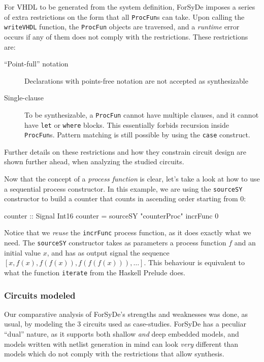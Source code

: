             For VHDL to be generated from the system definition, ForSyDe imposes a series of extra
            restrictions on the form that all \texttt{ProcFun}s can take. Upon calling the
            \texttt{writeVHDL} function, the \texttt{ProcFun} objects are traversed, and a
            \emph{runtime} error occurs if any of them does not comply with the restrictions.  These
            restrictions are:

            \begin{description}
                \item[``Point-full'' notation] Declarations with points-free notation are not
                    accepted as synthesizable

                \item[Single-clause] To be synthesizable, a \texttt{ProcFun} cannot have multiple
                    clauses, and it cannot have \texttt{let} or \texttt{where} blocks.  This
                    essentially forbids recursion inside \texttt{ProcFun}s. Pattern matching is
                    still possible by using the \texttt{case} construct.
            \end{description}

            Further details on these restrictions and how they constrain circuit design are shown
            further ahead, when analyzing the studied circuits.

            Now that the concept of a \emph{process function} is clear, let's take a look at how to
            use a sequential process constructor. In this example, we are using the
            \texttt{sourceSY} constructor to build a counter that counts in ascending order starting
            from 0:

            \begin{haskellcode}
    counter :: Signal Int16
    counter = sourceSY "counterProc" incrFunc 0
            \end{haskellcode}

            Notice that we \emph{reuse} the \texttt{incrFunc} process function, as it does exactly
            what we need. The \texttt{sourceSY} constructor takes as parameters a process function
            $f$ and an initial value $x$, and has as output signal the sequence $ [x, f(x), f(f(x)),
            f(f(f(x))), \ldots] $. This behaviour is equivalent to what the function
            \texttt{iterate} from the Haskell Prelude does.


        \subsubsection{Circuits modeled}
        \label{subsubsec:forsyde-circuits}
            Our comparative analysis of ForSyDe's strengths and weaknesses was done, as usual, by
            modeling the 3 circuits used as case-studies. ForSyDe has a peculiar ``dual'' nature,
            as it supports both shallow \emph{and} deep embedded models, and models written with
            netlist generation in mind can look \emph{very} different than models which do not
            comply with the restrictions that allow synthesis.

